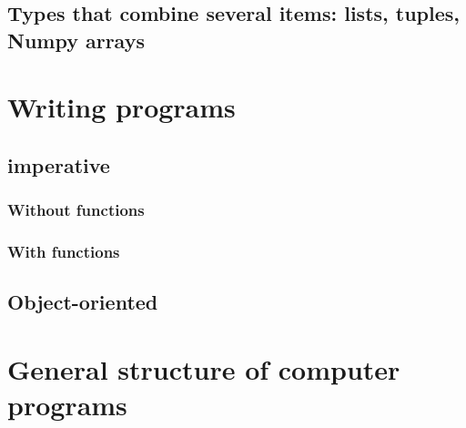 \documentclass[a4paper,10pt]{amsart}
\begin{document}
\subsection{Types that combine several items: lists, tuples, Numpy arrays}




\section{Writing programs}


\subsection{imperative}

\subsubsection{Without functions}

\subsubsection{With functions}

\subsection{Object-oriented}



\section{General structure of computer programs}
\end{document}
